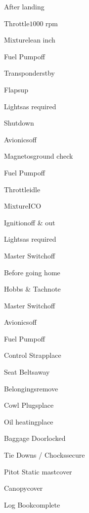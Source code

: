 \begin{multicols}{2}
\begin{checklist}{After landing}
    \item{Throttle}{$1000$ rpm}
    \item{Mixture}{lean  inch}
    \item{Fuel Pump}{off}
    \item{Transponder}{stby}
    \item{Flaps}{up}
    \item{Lights}{as required}
\end{checklist}

\begin{checklist}{Shutdown}
    \item{Avionics}{off}
    \item{Magnetos}{ground check}
    \item{Fuel Pump}{off}
    \item{Throttle}{idle}
    \item{Mixture}{ICO}
    \item{Ignition}{off \& out}
    \item{Lights}{as required}
    \item{Master Switch}{off}
\end{checklist}

\begin{checklist}{Before going home}
    \item{Hobbs \& Tach}{note}
    \item{Master Switch}{off}
    \item{Avionics}{off}
    \item{Fuel Pump}{off}
    \item{Control Strap}{place}
    \item{Seat Belts}{away}
    \item{Belongings}{remove}
    \item{Cowl Plugs}{place}
    \item{Oil heating}{place}
    \item{Baggage Door}{locked}
    \item{Tie Downs / Chocks}{secure}
    \item{Pitot Static mast}{cover}
    \item{Canopy}{cover}
    \item{Log Book}{complete}
\end{checklist}
\end{multicols}


